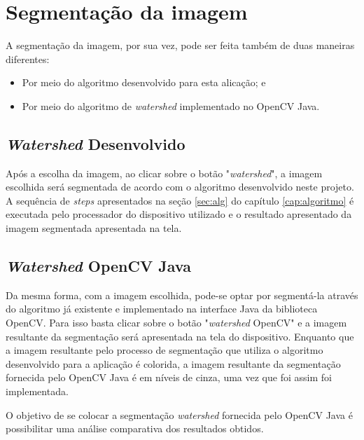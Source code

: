 \section{Segmentação da imagem}\label{sec:segmentacao_aplicacao}

A segmentação da imagem, por sua vez, pode ser feita também de duas maneiras diferentes:
\begin{itemize}
    \item Por meio do algoritmo desenvolvido para esta alicação; e
    \item Por meio do algoritmo de \textit{watershed} implementado no OpenCV Java.
\end{itemize}

\subsection{\textit{Watershed} Desenvolvido}

Após a escolha da imagem, ao clicar sobre o botão "\textit{watershed}", a imagem escolhida será segmentada de acordo com o algoritmo desenvolvido neste projeto. A sequência de \textit{steps} apresentados na seção \ref{sec:alg} do capítulo \ref{cap:algoritmo} é executada pelo processador do dispositivo utilizado e o resultado apresentado da imagem segmentada apresentada na tela.  

\subsection{\textit{Watershed} OpenCV Java}

Da mesma forma, com a imagem escolhida, pode-se optar por segmentá-la através do algoritmo já existente e implementado na interface Java da biblioteca OpenCV. Para isso basta clicar sobre o botão "\textit{watershed} OpenCV" e a imagem resultante da segmentação será apresentada na tela do dispositivo. Enquanto que a imagem resultante pelo processo de segmentação que utiliza o algoritmo desenvolvido para a aplicação é colorida, a imagem resultante da segmentação fornecida pelo OpenCV Java é em níveis de cinza, uma vez que foi assim foi implementada.




O objetivo de se colocar a segmentação  \textit{watershed} fornecida pelo OpenCV Java é possibilitar uma análise comparativa dos resultados obtidos.